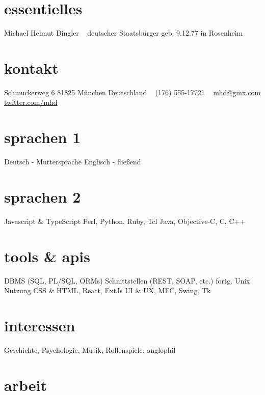 \documentclass[]{friggeri-cv-a4}
\begin{document}


\begin{aside} %
\section{essentielles}
Michael Helmut Dingler
~
deutscher Staatsbürger
geb. 9.12.77 in Rosenheim
\section{kontakt}
Schmuckerweg 6
81825 München
Deutschland
~
(176) 555-17721
~
\href{mailto:mhd@gmx.com}{mhd@gmx.com}
\href{http://twitter.com/mhd}{twitter.com/mhd}
\section{sprachen 1}
Deutsch - Muttersprache
Englisch - fließend
\section{sprachen 2}
Javascript \& TypeScript
Perl, Python, Ruby, Tcl
Java, Objective-C, C, C++
\section{tools \& apis}
DBMS (SQL, PL/SQL, ORMs)
Schnittstellen (REST, SOAP, etc.)
fortg. Unix Nutzung
CSS \& HTML, React, ExtJs
UI \& UX, MFC, Swing, Tk
\section{interessen}
Geschichte, Psychologie,
Musik, Rollenspiele,
anglophil
\end{aside}


\section{arbeit}

\end{document}
